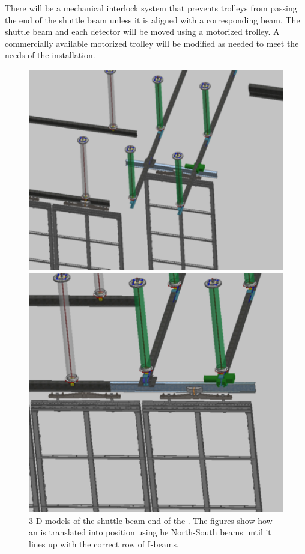 There will be a mechanical interlock system that prevents trolleys
from passing the end of the shuttle beam unless it is aligned with a
corresponding  beam.  The shuttle beam and each detector will be
moved using a motorized trolley.  A commercially available motorized
trolley will be modified as needed to meet the needs of the
installation.
\begin{figure}[htbp]
\begin{center}
\begin{minipage}[c]{0.49\textwidth}
\includegraphics[width=\textwidth]{far-detector-single-phase/figures/Shuttle-1.pdf}
\end{minipage}
\begin{minipage}[c]{0.42\textwidth}
\includegraphics[width=\textwidth]{far-detector-single-phase/figures/shuttle-2.pdf}
\end{minipage}
\caption{3-D models of the shuttle beam end of the . The figures show how an 
is translated into position using he North-South beams until it lines up with the correct
row of I-beams.}
\label{shuttle}
\end{center}
\end{figure}

